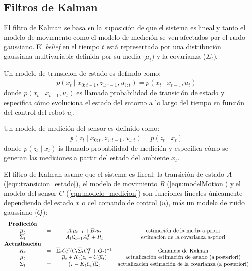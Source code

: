 \subsection{Filtros de Kalman}

El filtro de Kalman se basa en la suposición de que el sistema es lineal y 
tanto el modelo de movimiento como el modelo de medición se ven afectados por 
el ruido gaussiano. El \textit{belief} en el tiempo $t$ está representada por 
una distribución gaussiana multivariable definida por su media ($\mu_{t}$) y la 
covarianza ($\Sigma_{t}$).

Un modelo de transici\'on de estado es definido como:
\begin{align}
\label{eqn:transicion_estado}
p(x_{t}\mid x_{0:t-1}, z_{1:t-1}, u_{1:t}) = p(x_{t}\mid x_{t-1}, u_{t})
\end{align}
donde $p(x_{t}\mid x_{t-1}, u_{t})$ es llamada probabilidad de transición 
de estado y especifica cómo evoluciona el estado del entorno a lo largo 
del tiempo en función del control del robot $u_{t}$.

Un modelo de medici\'on del sensor es definido como:
\begin{align}
\label{eqn:modelo_medicion}
p(z_{t}\mid x_{0:t}, z_{1:t-1}, u_{1:t}) = p (z_{t}\mid x_{t})
\end{align}
donde $p(z_{t}\mid x_{t})$ is llamado probabilidad de medición y especifica 
cómo se generan las mediciones a partir del estado del ambiente $x_{t}$.

El filtro de Kalman asume que el sistema es lineal: la transición de estado 
$A$ (\ref{eqn:transicion_estado}), el modelo de movimiento $B$ (\ref{eqn:modelMotion})  
y el modelo del sensor $C$ (\ref{eqn:modelo_medicion}) son funciones lineales únicamente 
dependiendo del estado $x$ o del comando de control ($u$), más un modelo 
de ruido gaussiano ($Q$):
\begin{equation*}
\label{eqn: Kalman Filter}
\begin{matrix}
\textrm{\textbf{Predicción}}\\
\overline{\mu}_{t} &= &A_{t}\mu_{t-1} + B_{t} u_{t} &\textrm{estimación de la media a-priori}\\
\overline{\Sigma}_{t} &= &A_{t}\Sigma_{t-1} A_{t}^{T} + R_{t} &\textrm{estimación de la covarianza a-priori}\\
\textrm{\textbf{Actualización}}\\
K_{t} &= &\overline{\Sigma}_{t}C_{t}^{T}(C_{t}\overline{\Sigma}_{t}C_{t}^{T} + Q_{t})^{-1} &\textrm{Ganancia de Kalman}\\
\mu_{t} &= &\overline{\mu}_{t} + K_{t}(z_{t} - C_{t}\overline{\mu}_{t}) &\textrm{actualización estimación de estado (a posteriori)}\\
\Sigma_{t} &= &(I - K_{t}C_{t})\overline{\Sigma}_{t} &\textrm{actualización estimación de la covarianza (a posteriori)}\\
\end{matrix}
\end{equation*}

